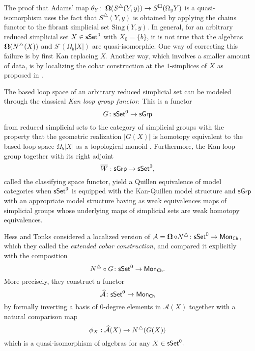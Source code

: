 The proof that Adams’ map $\theta_Y \colon \operatorname{\mathbf{\Omega}}(S^\triangle(Y, y)) \to S^{\square}(\Omega_y Y)$ is a quasi-isomorphism uses the fact that $S^\triangle(Y, y)$ is obtained by applying the chains functor to the fibrant simplicial set $\text{Sing}(Y,y)$. In general, for an arbitrary reduced simplicial set $X \in \mathsf{sSet}^0$ with $X_0=\{b\}$,  it is not true that the algebras
$\operatorname{\mathbf{\Omega}}(N^{\triangle}(X))$ and $S^{\square}(\Omega_b |X|)$ are quasi-isomorphic. One way of correcting this failure is by first Kan replacing $X$. Another way, which involves a smaller amount of data, is by localizing the cobar construction at the $1$-simplices of $X$ as proposed in \cite{hess2010cobar}.

The based loop space of an arbitrary reduced simplicial set can be modeled through the classical \textit{Kan loop group functor}. This is a functor 
$$G\colon \mathsf{sSet}^0 \to \mathsf{sGrp}$$ from reduced simplicial sets to the category of simplicial groups with the property that the geometric realization $|G(X)|$ is homotopy equivalent to the based loop space $\Omega_b|X|$ as a topological monoid \cite{berger1995loops}. Furthermore, the Kan loop group together with its right adjoint $$\overline{W}: \mathsf{sGrp} \to \mathsf{sSet}^0,$$ called the classifying space functor, yield a Quillen equivalence of model categories when $\mathsf{sSet}^0$ is equipped with the Kan-Quillen model structure and $\mathsf{sGrp}$ with an appropriate model structure having as weak equivalences maps of simplicial groups whose underlying maps of simplicial sets are weak homotopy equivalences. 

Hess and Tonks considered a localized version of $\mathcal{A} = \operatorname{\mathbf{\Omega}} \circ N^{\triangle} \colon \mathsf{sSet}^0 \to \mathsf{Mon}_{\mathsf{Ch}}$, which they called the \textit{extended cobar construction}, and compared it explicitly with the composition $$N^{\triangle} \circ G \colon \mathsf{sSet}^0 \to \mathsf{Mon}_{\mathsf{Ch}}.$$ More precisely, they construct a functor
$$\widehat{\mathcal{A}} \colon \mathsf{sSet}^0 \to \mathsf{Mon}_{\mathsf{Ch}}$$
by formally inverting a basis of $0$-degree elements in $\mathcal{A}(X)$ together with a natural comparison map
$$\phi_X: \widehat{\mathcal{A}}(X) \to N^{\triangle}(G(X))$$
which is a quasi-isomorphism of algebras for any $X \in \mathsf{sSet}^0.$

